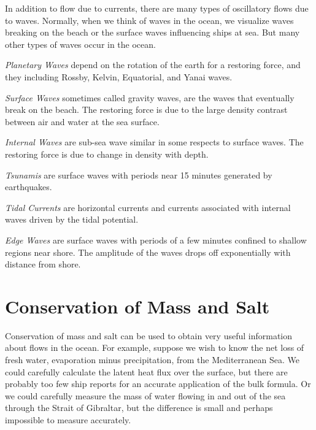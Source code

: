 In addition to flow due to currents, there are many types of oscillatory flows
due to waves. Normally, when we think of waves in the ocean, we visualize waves
breaking on the beach or the surface waves influencing ships at sea. But many
other types of waves occur in the ocean.
\begin{enumerate}
\vitem\textit{Planetary Waves} depend on the rotation of the
earth for a restoring force, and they including Rossby,
Kelvin, Equatorial, and Yanai
waves. 

\vitem\textit{Surface Waves} sometimes called gravity waves, are the waves that eventually break on
the beach. The restoring force is due to the large density contrast between air and
water at the sea surface.

\vitem\textit{Internal Waves} are sub-sea wave
similar in some respects to surface waves. The restoring force is due to change in
density with depth. 

\vitem\textit{Tsunamis}
are surface waves with periods near 15 minutes generated by
earthquakes. 

\vitem\textit{Tidal Currents} are horizontal currents and currents associated with internal waves
driven by the tidal potential. 

\vitem\textit{Edge Waves} are surface waves with periods of a few minutes confined to shallow
regions near shore. The amplitude of the waves drops off exponentially with
distance from shore.
\end{enumerate}

\section{Conservation of Mass and Salt}
Conservation of mass and salt can be
used to obtain very useful information about flows in the ocean.
For example, suppose we wish to know the net loss of fresh water,
evaporation minus precipitation, from the Mediterranean Sea. We
could carefully calculate the latent heat flux over the surface,
but there are probably too few ship reports for an accurate
application of the bulk formula. Or we could carefully measure the
mass of water flowing in and out of the sea through the Strait of
Gibraltar, but the difference is small and perhaps impossible to
measure accurately.

